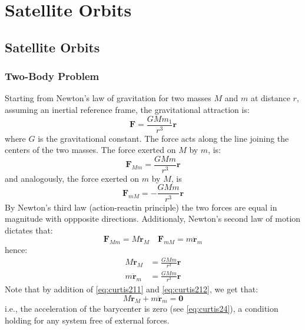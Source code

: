 \chapter{Satellite Orbits}
\label{ch:satellite-orbits}

\section{Satellite Orbits}

\subsection{Two-Body Problem}
\label{ssec:keplerian-orbits}
Starting from Newton's law of gravitation for two masses $M$ and $m$ at 
distance $r$, assuming an inertial reference frame, the gravitational 
attraction is:
\begin{equation}
  \label{eq:chobotov31}
  \bm{F} = \frac{G M m_1}{r^3} \bm{r}
\end{equation}
where $G$ is the gravitational constant. The force acts along the line joining 
the centers of the two masses. The force exerted on $M$ by $m$, is:
\begin{equation}\label{eq:curtis29}
  \bm{F}_{Mm} = \frac{G M m}{r^3} \bm{r}
\end{equation}
and analogously, the force exerted on $m$ by $M$, is
\begin{equation}\label{eq:curtis210}
  \bm{F}_{mM} = -\frac{G M m}{r^3} \bm{r}
\end{equation}
By Newton's third law (action-reactin principle) the two forces are equal in 
magnitude with oppposite directions. Additionaly, Newton's second law of motion
dictates that:
\begin{equation}\label{eq:curtis2105}
  \bm{F}_{Mm} = M \ddot{\bm{r}}_M \quad \bm{F}_{mM} = m \ddot{\bm{r}}_m
\end{equation}
hence:
\begin{subequations}
  \begin{align}
    M \ddot{\bm{r}}_M &= \frac{G M m}{r^3} \bm{r} \label{eq:curtis211} \\
    m \ddot{\bm{r}}_m &= \frac{G M m}{r^3} \bm{r} \label{eq:curtis212}
  \end{align}
\end{subequations}
Note that by addition of \ref{eq:curtis211} and \ref{eq:curtis212}, we get that:
\begin{equation}
  M \ddot{\bm{r}}_M + m \ddot{\bm{r}}_m = \bm{0}
\end{equation}
i.e., the acceleration of the barycenter is zero (see \ref{eq:curtis24}), a 
condition holding for any system free of external forces.

